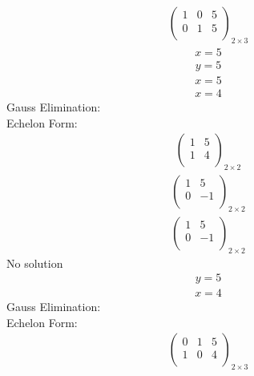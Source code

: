 \documentclass{article}
\begin{document}
\begin{align*}
\left(
\begin{array}{cc|c}
1 & 0 & 5\\
0 & 1 & 5\\
\end{array}
\right)_{2\times 3}
\end{align*}
\begin{align*}
x=5\end{align*}
\begin{align*}
y=5\end{align*}
\begin{align*}
x=5\end{align*}
\begin{align*}
x=4\end{align*}
Gauss Elimination:\\
Echelon Form:\\
\begin{align*}
\left(
\begin{array}{c|c}
1 & 5\\
1 & 4\\
\end{array}
\right)_{2\times 2}
\end{align*}
\begin{align*}
\left(
\begin{array}{c|c}
1 & 5\\
0 & -1\\
\end{array}
\right)_{2\times 2}
\end{align*}
\begin{align*}
\left(
\begin{array}{c|c}
1 & 5\\
0 & -1\\
\end{array}
\right)_{2\times 2}
\end{align*}
No solution\\
\begin{align*}
y=5\end{align*}
\begin{align*}
x=4\end{align*}
Gauss Elimination:\\
Echelon Form:\\
\begin{align*}
\left(
\begin{array}{cc|c}
0 & 1 & 5\\
1 & 0 & 4\\
\end{array}
\right)_{2\times 3}
\end{align*}
\end{document}

